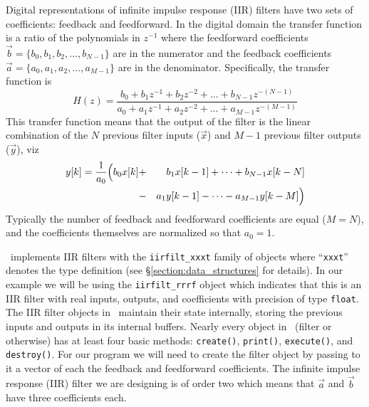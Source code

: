 Digital representations of infinite impulse response (IIR) filters have
two sets of coefficients: feedback and feedforward.
In the digital domain the transfer function is a ratio of the
polynomials in $z^{-1}$ where the feedforward coefficients
$\vec{b} = \{b_0, b_1, b_2, \ldots, b_{N-1}\}$
are in the numerator and the feedback coefficients
$\vec{a} = \{a_0, a_1, a_2, \ldots, a_{M-1}\}$
are in the denominator.
Specifically, the transfer function is
%
\begin{equation}
    H(z) =
        \frac{
            b_0 + b_1 z^{-1} + b_2 z^{-2} + \ldots + b_{N-1}z^{-(N-1)}
        }{
            a_0 + a_1 z^{-1} + a_2 z^{-2} + \ldots + a_{M-1}z^{-(M-1)}
        }
\end{equation}
%
This transfer function means that the output of the filter is the linear
combination of the $N$ previous filter inputs
($\vec{x}$)
and $M-1$ previous filter outputs
($\vec{y}$),
viz
%
\begin{eqnarray}
    y[k] =
        \frac{1}{a_0}
        \Bigl(
            b_0 x[k] &+& b_1 x[k-1] + \cdots + b_{N-1} x[k-N]\\
                     &-& a_1 y[k-1] - \cdots - a_{M-1} y[k-M]
        \Bigr)
\end{eqnarray}
%
Typically the number of feedback and feedforward coefficients are equal
($M=N$), and the coefficients themselves are normalized so that $a_0=1$.

\liquid\ implements IIR filters with the {\tt iirfilt\_xxxt} family of
objects where ``{\tt xxxt}'' denotes the type definition
(see \S\ref{section:data_structures} for details).
In our example we will be using the {\tt iirfilt\_rrrf} object which
indicates that this is an IIR filter with real inputs, outputs, and
coefficients with precision of type {\tt float}.
The IIR filter objects in \liquid\ maintain their state
internally, storing the previous inputs and outputs in its internal
buffers.
Nearly every object in \liquid\ (filter or otherwise) has at least four
basic methods:
{\tt create()},
{\tt print()},
{\tt execute()}, and
{\tt destroy()}.
For our program we will need to create the filter object by passing to
it a vector of each the feedback and feedforward coefficients.
The infinite impulse response (IIR) filter we are designing is of order
two which means that $\vec{a}$ and $\vec{b}$ have three coefficients
each.

